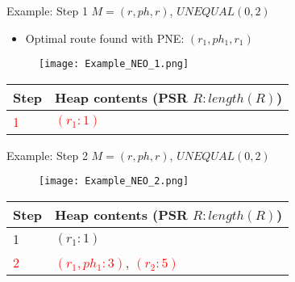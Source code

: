 \begin{frame}[noframenumbering]{Example: Step 1}
	$M = (r, ph, r)$, $UNEQUAL(0, 2)$
	
	\begin{itemize}
		\item Optimal route found with PNE: $(r_1, ph_1, r_1)$
	\end{itemize}
	
	\begin{figure}[h]
		\texttt{[image: Example\_NEO\_1.png]}
	\end{figure}
	
	\begin{table}[h]
		\centering
		\begin{tabular}{ |l|p{10cm}| } 
			\hline
			Step & Heap contents (PSR $R : length(R)$) \\
			\hline
			\textcolor{red}{1} & \textcolor{red}{$(r_1 : 1)$} \\ 
			\hline
		\end{tabular}
	\end{table}

\end{frame}

\begin{frame}[noframenumbering]{Example: Step 2}
	$M = (r, ph, r)$, $UNEQUAL(0, 2)$
	
	\begin{figure}[h]
		\texttt{[image: Example\_NEO\_2.png]}
	\end{figure}
	
	\begin{table}[h]
		\centering
		\begin{tabular}{ |l|p{10cm}| } 
			\hline
			Step & Heap contents (PSR $R : length(R)$) \\
			\hline
			1 & $(r_1 : 1)$ \\ 
			\hline
			\textcolor{red}{2} & \textcolor{red}{$(r_1, ph_1 : 3)$}, \textcolor{red}{$(r_2 : 5)$} \\ 
			\hline
		\end{tabular}
	\end{table}

\end{frame}

